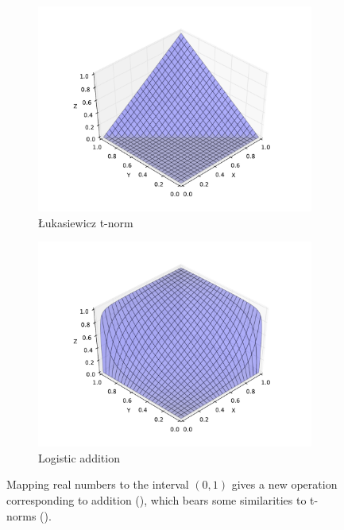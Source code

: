 \documentclass[journal]{IEEEtran}
\theoremstyle{definition}
\begin{document}
\begin{figure}
  \begin{subfigure}{0.49\textwidth}
    \includegraphics[width=\textwidth]{lukasiewicz.pdf}
    \caption{\L ukasiewicz t-norm}
    \label{fig:lukasiewicz}
  \end{subfigure}
  \begin{subfigure}{0.49\textwidth}
    \includegraphics[width=\textwidth]{rieszfunc.pdf}
    \caption{Logistic addition}
    \label{fig:logistic}
  \end{subfigure}
  \caption{Mapping real numbers to the interval $(0,1)$ gives a new
    operation corresponding to addition (), which
    bears some similarities to t-norms ().}
  \label{fig:tnorm}
\end{figure}
\end{document}

